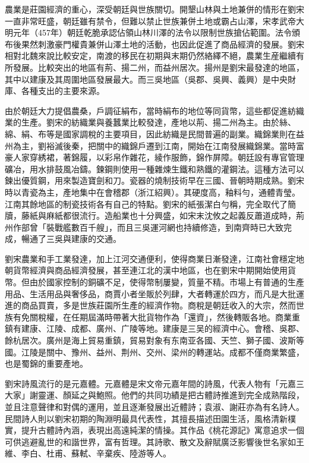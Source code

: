 農業是莊園經濟的重心，深受朝廷與世族關切。開墾山林與土地兼併的情形在劉宋一直非常旺盛，朝廷雖有禁令，但難以禁止世族兼併土地或霸占山澤，宋孝武帝大明元年（457年）朝廷乾脆承認佔領山林川澤的法令以限制世族搶佔範圍。法令頒布後果然刺激豪門權貴兼併山澤土地的活動，也因此促進了商品經濟的發展。劉宋相對北魏來說比較安定，南渡的移民在初期與末期仍然絡繹不絕，農業生産繼續有所發展。比較突出的地區有荊、揚二州，而益州居次。揚州是劉宋最發達的地區，其中以建康及其周圍地區發展最大。而三吳地區（吳郡、吳興、義興）是中央財庫、各種支出的主要來源。

由於朝廷大力提倡農桑，戶調征絹布，當時絹布的地位等同貨幣，這些都促進紡織業的生產。劉宋的紡織業與養蠶業比較發達，產地以荊、揚二州為主。由於絲、綿、絹、布等是國家調稅的主要項目，因此紡織是民間普遍的副業。織錦業則在益州為主，劉裕滅後秦，把關中的織錦戶遷到江南，開始在江南發展織錦業。當時富豪人家穿綉裙，著錦履，以彩帛作雜花，綾作服飾，錦作屏障。朝廷設有專官管理礦冶，用水排鼓風冶鑄。鍊鋼則使用一種雜煉生鐵和熟鐵的灌鋼法。這種方法可以鍊出優質鋼，用來製造寶劍和刀。瓷器的燒制技術早在三國、晉朝時期成熟。劉宋時以青瓷為主，產地集中在會稽郡（浙江紹興）。其硬度高，釉料勻，通體青瑩。江南其餘地區的制瓷技術各有自己的特點。劉宋的紙張潔白勻稱，完全取代了簡牘，藤紙與麻紙都很流行。造船業也十分興盛，如宋末沈攸之起義反蕭道成時，荊州作部曾「裝戰艦數百千艘」，而且三吳運河網也持續修造，到南齊時已大致完成，暢通了三吳與建康的交通。

劉宋農業和手工業發達，加上江河交通便利，使得商業日漸發達，江南社會穩定地朝貨幣經濟與商品經濟發展，甚至連江北的漢中地區，也在劉宋中期開始使用貨幣。但由於國家控制的銅礦不足，使得幣制屢變，質量不精。市場上有普通的生產用品、生活用品與奢侈品，商賈小者坐販於列肆，大者轉運於四方，而凡是大批運進的商品買賣，多是世族莊園所生產的經濟作物。商稅是朝廷收入的大宗，然而世族有免關稅權，在任期屆滿時帶著大批貨物作為「還資」，然後轉販各地。商業重鎮有建康、江陵、成都、廣州、广陵等地。建康是三吴的經濟中心。會稽、吳郡、餘杭居次。廣州是海上貿易重鎮，貿易對象有东南亚各國、天竺、獅子國、波斯等國。江陵是關中、豫州、益州、荆州、交州、梁州的轉運站。成都不僅商業繁盛，也是蜀錦的重要產地。

劉宋詩風流行的是元嘉體。元嘉體是宋文帝元嘉年間的詩風，代表人物有「元嘉三大家」謝靈運、顏延之與鮑照。他們的共同功績是把古體詩推進到完全成熟階段，並且注意聲律和對偶的運用，並且逐漸發展出近體詩；袁淑、謝莊亦為有名詩人。民間詩人則以劉宋初期的陶淵明最具代表性，其擅長描述田園生活，風格清新樸實，提升古體詩內涵，表現出高遠純潔的情操。其作品《桃花源記》寓意追求一個可供逃避亂世的和諧世界，富有哲理。其詩歌、散文及辭賦廣泛影響後世名家如王維、李白、杜甫、蘇軾、辛棄疾、陸游等人。

